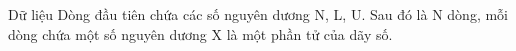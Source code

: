 Dữ liệu  
Dòng đầu tiên chứa các số nguyên dương N, L, U. Sau đó là N dòng, mỗi dòng chứa một số nguyên dương X là một phần tử của dãy số.